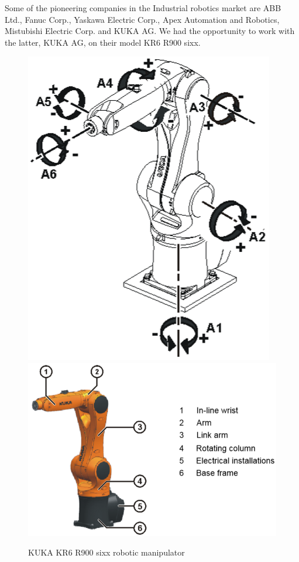 Some of the pioneering companies in the Industrial robotics market are ABB Ltd., Fanuc Corp., Yaskawa Electric Corp., Apex Automation and Robotics, Mistubishi Electric Corp. and KUKA AG. We had the opportunity to work with the latter, KUKA AG, on their model KR6 R900 sixx.
\begin{figure}[H]
    \centering
    \includegraphics[scale=0.40]{figures/specs6}
     \includegraphics[scale=0.45]{figures/specsc}
    \caption{KUKA KR6 R900 sixx robotic manipulator}
\end{figure}

